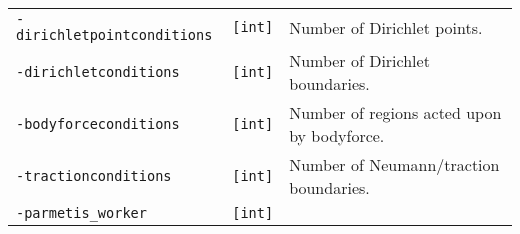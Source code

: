 \begin{longtable}[]{@{}lll@{}}
\begin{minipage}[t]{0.26\columnwidth}
\lstinline!-dirichletpointconditions!\strut
\end{minipage} & \begin{minipage}[t]{0.09\columnwidth}\raggedright\strut
\lstinline![int]!\strut
\end{minipage} & \begin{minipage}[t]{0.56\columnwidth}\raggedright\strut
Number of Dirichlet points.\strut
\end{minipage}\tabularnewline
\begin{minipage}[t]{0.26\columnwidth}\raggedright\strut
\lstinline!-dirichletconditions!\strut
\end{minipage} & \begin{minipage}[t]{0.09\columnwidth}\raggedright\strut
\lstinline![int]!\strut
\end{minipage} & \begin{minipage}[t]{0.56\columnwidth}\raggedright\strut
Number of Dirichlet boundaries.\strut
\end{minipage}\tabularnewline
\begin{minipage}[t]{0.26\columnwidth}\raggedright\strut
\lstinline!-bodyforceconditions!\strut
\end{minipage} & \begin{minipage}[t]{0.09\columnwidth}\raggedright\strut
\lstinline![int]!\strut
\end{minipage} & \begin{minipage}[t]{0.56\columnwidth}\raggedright\strut
Number of regions acted upon by bodyforce.\strut
\end{minipage}\tabularnewline
\begin{minipage}[t]{0.26\columnwidth}\raggedright\strut
\lstinline!-tractionconditions!\strut
\end{minipage} & \begin{minipage}[t]{0.09\columnwidth}\raggedright\strut
\lstinline![int]!\strut
\end{minipage} & \begin{minipage}[t]{0.56\columnwidth}\raggedright\strut
Number of Neumann/traction boundaries.\strut
\end{minipage}\tabularnewline
\begin{minipage}[t]{0.26\columnwidth}\raggedright\strut
\lstinline!-parmetis_worker!\strut
\end{minipage} & \begin{minipage}[t]{0.09\columnwidth}\raggedright\strut
\lstinline![int]!\strut
\end{minipage} & \begin{minipage}[t]{0.56\columnwidth}\raggedright\strut

\end{minipage}
\end{longtable}
